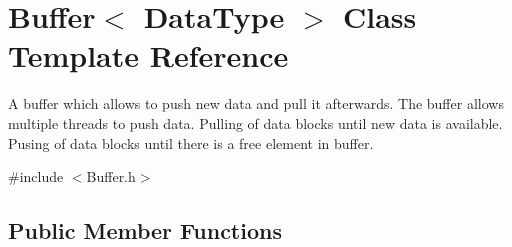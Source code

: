 \hypertarget{class_buffer}{}\section{Buffer$<$ Data\+Type $>$ Class Template Reference}
\label{class_buffer}


A buffer which allows to push new data and pull it afterwards. The buffer allows multiple threads to push data. Pulling of data blocks until new data is available. Pusing of data blocks until there is a free element in buffer.  




{\ttfamily \#include $<$Buffer.\+h$>$}

\subsection*{Public Member Functions}
